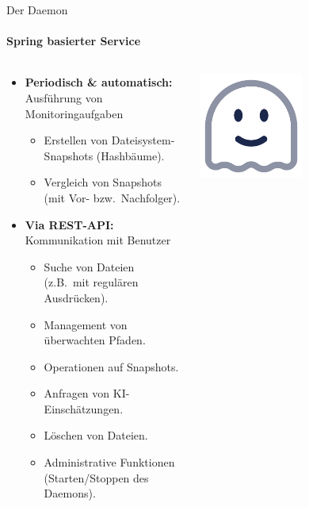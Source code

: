 \documentclass[
    ngerman,%
    authorontitle=true,
]{bfhbeamer}
\begin{document}
    \begin{frame}{Der Daemon}
        \framesubtitle{Spring basierter Service}
        \begin{columns}
            \begin{column}{0.7\textwidth}
                \begin{itemize}
                    \item \textbf{Periodisch \& automatisch:} Ausführung von Monitoringaufgaben
                    \begin{itemize}
                        \item Erstellen von Dateisystem-Snapshots (Hashbäume).
                        \item Vergleich von Snapshots (mit Vor- bzw.\ Nachfolger).
                    \end{itemize}
                    \item \textbf{Via REST-API:} Kommunikation mit Benutzer
                    \begin{itemize}
                        \item Suche von Dateien (z.B.\ mit regulären Ausdrücken).
                        \item Management von überwachten Pfaden.
                        \item Operationen auf Snapshots.
                        \item Anfragen von KI-Einschätzungen.
                        \item Löschen von Dateien.
                        \item Administrative Funktionen (Starten/Stoppen des Daemons).
                    \end{itemize}
                \end{itemize}
            \end{column}
            \begin{column}{0.3\textwidth}
                \begin{center}
                    \includegraphics[width=0.5\textwidth]{assets/presentation/ghost-smile}
                \end{center}
            \end{column}
        \end{columns}

    \end{frame}
\end{document}
